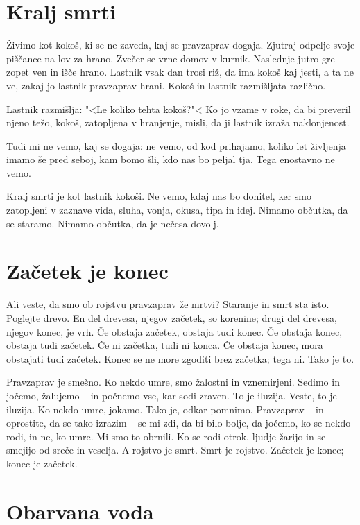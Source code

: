 \section{Kralj smrti}

Živimo kot kokoš, ki se ne zaveda, kaj se pravzaprav dogaja. Zjutraj odpelje svoje piščance na lov za hrano. Zvečer se vrne domov v kurnik. Naslednje jutro gre zopet ven in išče hrano. Lastnik vsak dan trosi riž, da ima kokoš kaj jesti, a ta ne ve, zakaj jo lastnik pravzaprav hrani. Kokoš in lastnik razmišljata različno.

Lastnik razmišlja: "<Le koliko tehta kokoš?"< Ko jo vzame v roke, da bi preveril njeno težo, kokoš, zatopljena v hranjenje, misli, da ji lastnik izraža naklonjenost.

Tudi mi ne vemo, kaj se dogaja: ne vemo, od kod prihajamo, koliko let življenja imamo še pred seboj, kam bomo šli, kdo nas bo peljal tja. Tega enostavno ne vemo.

Kralj smrti je kot lastnik kokoši. Ne vemo, kdaj nas bo dohitel, ker smo zatopljeni v zaznave vida, sluha, vonja, okusa, tipa in idej. Nimamo občutka, da se staramo. Nimamo občutka, da je nečesa dovolj.

\section{Začetek je konec}

Ali veste, da smo ob rojstvu pravzaprav že mrtvi? Staranje in smrt sta isto. Poglejte drevo. En del drevesa, njegov začetek, so korenine; drugi del drevesa, njegov konec, je vrh. Če obstaja začetek, obstaja tudi konec. Če obstaja konec, obstaja tudi začetek. Če ni začetka, tudi ni konca. Če obstaja konec, mora obstajati tudi začetek. Konec se ne more zgoditi brez začetka; tega ni. Tako je to.

Pravzaprav je smešno. Ko nekdo umre, smo žalostni in vznemirjeni. Sedimo in jočemo, žalujemo – in počnemo vse, kar sodi zraven. To je iluzija. Veste, to je iluzija. Ko nekdo umre, jokamo. Tako je, odkar pomnimo. Pravzaprav – in oprostite, da se tako izrazim – se mi zdi, da bi bilo bolje, da jočemo, ko se nekdo rodi, in ne, ko umre. Mi smo to obrnili. Ko se rodi otrok, ljudje žarijo in se smejijo od sreče in veselja. A rojstvo je smrt. Smrt je rojstvo. Začetek je konec; konec je začetek.

\section{Obarvana voda}

